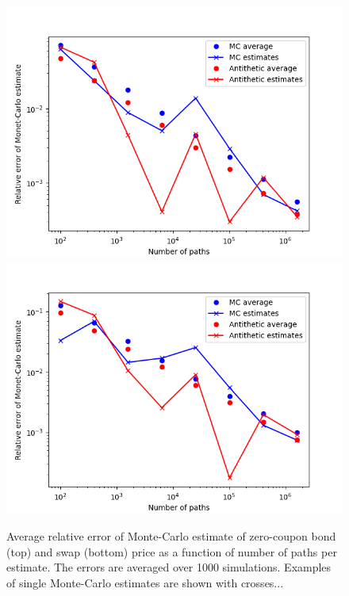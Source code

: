 \begin{figure}
\centering
\includegraphics[scale=0.7]{figures/hw_1f_zero_coupon_bond/mc_error_ZCBond.png}
\includegraphics[scale=0.7]{figures/hw_1f_swap/mc_error_Swap.png}
\caption{Average relative error of Monte-Carlo estimate of zero-coupon bond (top) and swap (bottom) price as a function of number of paths per estimate. The errors are averaged over 1000 simulations. Examples of single Monte-Carlo estimates are shown with crosses...}
\end{figure}



